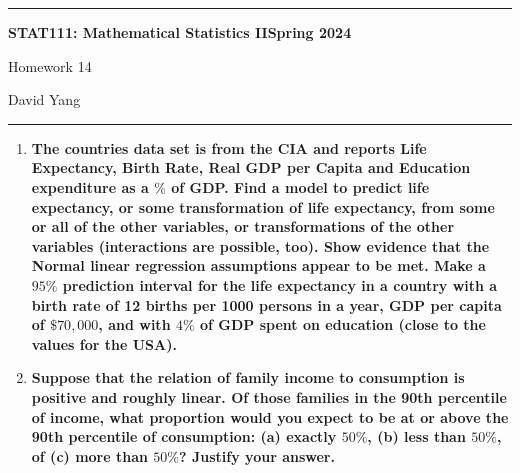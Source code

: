 \documentclass[11pt]{article}
\begin{document}
	\hrule
	\begin{center}
        \textbf{STAT111: Mathematical Statistics II}\hfill \textbf{Spring 2024}\newline

		{\Large Homework 14}

		David Yang
	\end{center}

\hrule

\vspace{1em}

\begin{enumerate}
    \item \textbf{The countries data set is from the CIA and reports Life Expectancy, Birth Rate, Real GDP per
    Capita and Education expenditure as a $\%$ of GDP. Find a model to predict life expectancy, or some
    transformation of life expectancy, from some or all of the other variables, or transformations of the
    other variables (interactions are possible, too). Show evidence that the Normal linear regression
    assumptions appear to be met. Make a $95\%$ prediction interval for the life expectancy in a country
    with a birth rate of 12 births per 1000 persons in a year, GDP per capita of $\$70,000$, and with $4\%$
    of GDP spent on education (close to the values for the USA).}
    
    \item \textbf{Suppose that the relation of family income to consumption is positive and roughly linear. Of those
    families in the 90th percentile of income, what proportion would you expect to be at or above the
    90th percentile of consumption: (a) exactly $50\%$, (b) less than $50\%$, of (c) more than $50\%$? Justify
    your answer.}
   
\end{enumerate}
\end{document}
